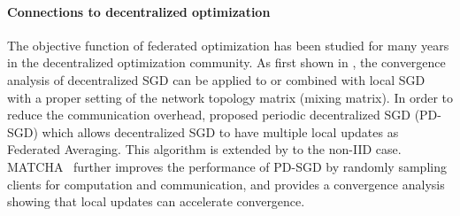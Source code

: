 \documentclass[11pt]{article}
\begin{document}
\paragraph{Connections to decentralized optimization} The objective function of federated optimization has been studied for many years in the decentralized optimization community. 
As first shown in \citet{wang2018cooperative}, the convergence analysis of decentralized SGD can be applied to or combined with local SGD with a proper setting of the network topology matrix (mixing matrix). In order to reduce the communication overhead, \citet{wang2018cooperative} proposed periodic decentralized SGD (PD-SGD) which allows decentralized SGD to have multiple local updates as Federated Averaging. This algorithm is  extended by \citet{li2019communication} to the non-IID case. MATCHA~\citep{wang2019matcha} further improves the performance of PD-SGD by randomly sampling clients for computation and communication, and provides a convergence analysis showing that local updates can accelerate convergence. 

\end{document}
